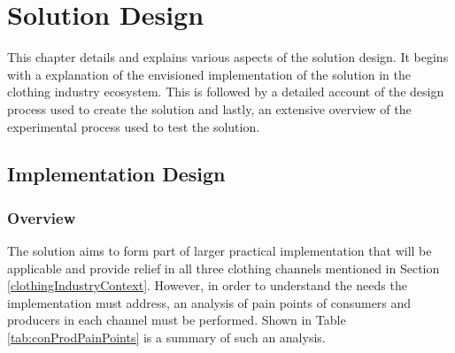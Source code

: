 \chapter{Solution Design}
This chapter details and explains various aspects of the solution design. It begins with a explanation of the envisioned implementation of the solution in the clothing industry ecosystem. This is followed by a detailed account of the design process used to create the solution and lastly, an extensive overview of the experimental process used to test the solution.

\section{Implementation Design}

\subsection{Overview}
The solution aims to form part of larger practical implementation that will be applicable and provide relief in all three clothing channels mentioned in Section \ref{clothingIndustryContext}. However, in order to understand the needs the implementation must address, an analysis of pain points of consumers and producers in each channel must be performed. Shown in Table \ref{tab:conProdPainPoints} is a summary of such an analysis.

